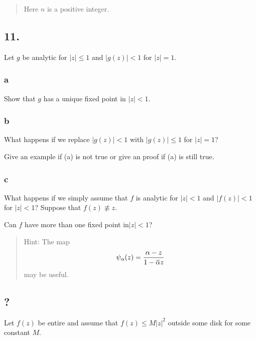 \begin{quote}
Here \(n\) is a positive integer.
\end{quote}

\hypertarget{section-16}{%
\subsection{11.}\label{section-16}}

Let \(g\) be analytic for \(|z|\leq 1\) and \(|g(z)| < 1\) for
\(|z| = 1\).

\hypertarget{a}{%
\subsubsection{a}\label{a}}

Show that \(g\) has a unique fixed point in \(|z| < 1\).

\hypertarget{b}{%
\subsubsection{b}\label{b}}

What happens if we replace \(|g(z)| < 1\) with \(|g(z)|\leq 1\) for
\(|z|=1\)?

Give an example if (a) is not true or give an proof if (a) is still
true.

\hypertarget{c}{%
\subsubsection{c}\label{c}}

What happens if we simply assume that \(f\) is analytic for \(|z| < 1\)
and \(|f(z)| < 1\) for \(|z| < 1\)? Suppose that \(f(z)\not\equiv z\).

Can \(f\) have more than one fixed point in\(|z| < 1\)?

\begin{quote}
Hint: The map
\begin{align*}\displaystyle{\psi_{\alpha}(z)=\frac{\alpha-z}{1-\mkern 1.5mu\overline{\mkern-1.5mu\alpha\mkern-1.5mu}\mkern 1.5muz}}\end{align*}
may be useful.
\end{quote}

\hypertarget{section-17}{%
\subsection{?}\label{section-17}}

Let \(f(z)\) be entire and assume that \(f(z) \leq M |z|^2\) outside
some disk for some constant \(M\).

